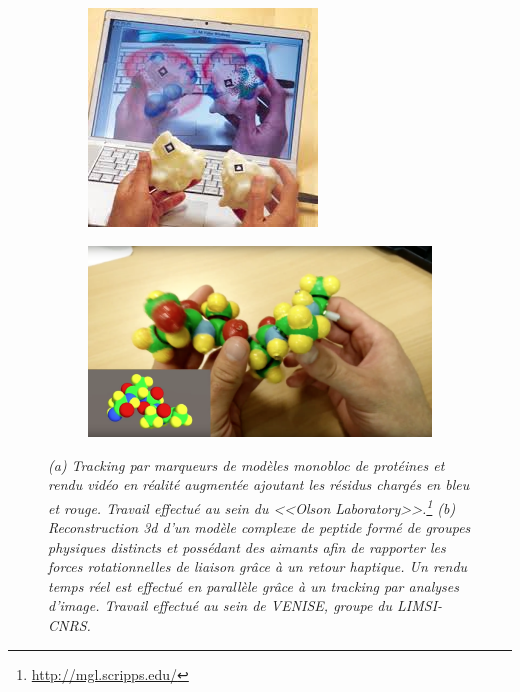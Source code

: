 \begin{figure}[h]
  \begin{subfigure}{.4\textwidth}
  \centering
  {\includegraphics[width=0.9\linewidth]{./figures/ch2/tangible_marker}}
    \caption{}
    \label{Fig:tangible_marker}
  \end{subfigure}
  \begin{subfigure}{.6\textwidth}
  \centering
  {\includegraphics[width=\linewidth]{./figures/ch2/tangible_xav}}
    \caption{}
    \label{Fig:tangible_xav}
  \hspace{0.3cm}
  \end{subfigure}
  \caption[(a) Système de Réalité Augmentée grâce à des modèles tangibles de protéines. (b) Reconstruction 3d d'un modèle à partir d'un modèle physique complexe.]
  {\it (a) Tracking par marqueurs de modèles monobloc de protéines et rendu vidéo en réalité augmentée ajoutant les résidus chargés en bleu et rouge. Travail effectué au sein du <<Olson Laboratory>>.\footnote{\url{http://mgl.scripps.edu/}}
  (b) Reconstruction 3d d'un modèle complexe de peptide formé de groupes physiques distincts et possédant des aimants afin de rapporter les forces rotationnelles de liaison grâce à un retour haptique. Un rendu temps réel est effectué en parallèle grâce à un tracking par analyses d'image. Travail effectué au sein de VENISE, groupe du LIMSI-CNRS.
  }
\end{figure}


